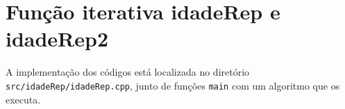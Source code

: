 \section{Função iterativa idadeRep e idadeRep2}
A implementação dos códigos está localizada no diretório \texttt{src/idadeRep/idadeRep.cpp}, junto de funções \texttt{main} com um algoritmo que os executa.

